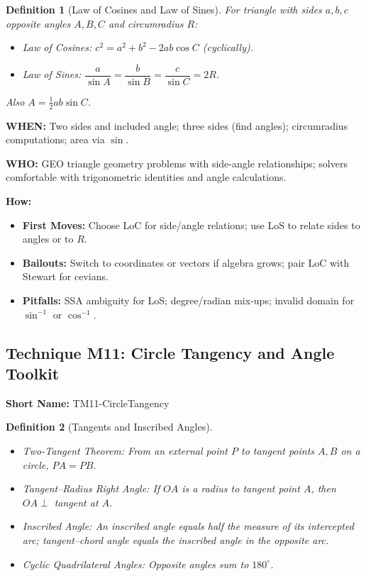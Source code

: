 \documentclass[12pt]{article}
\newtheorem{definition}{Definition}[section]
\begin{document}
\begin{definition}[Law of Cosines and Law of Sines]
For triangle with sides $a,b,c$ opposite angles $A,B,C$ and circumradius $R$:
\begin{itemize}
    \item Law of Cosines: $c^2=a^2+b^2-2ab\cos C$ (cyclically).
    \item Law of Sines: $\dfrac{a}{\sin A}=\dfrac{b}{\sin B}=\dfrac{c}{\sin C}=2R$.
\end{itemize}
Also $A=\tfrac{1}{2}ab\sin C$.
\end{definition}

\textbf{WHEN:} Two sides and included angle; three sides (find angles); circumradius computations; area via $\sin$.

\textbf{WHO:} GEO triangle geometry problems with side-angle relationships; solvers comfortable with trigonometric identities and angle calculations.

\textbf{How:}
\begin{itemize}
    \item \textbf{First Moves:} Choose LoC for side/angle relations; use LoS to relate sides to angles or to $R$.
    \item \textbf{Bailouts:} Switch to coordinates or vectors if algebra grows; pair LoC with Stewart for cevians.
    \item \textbf{Pitfalls:} SSA ambiguity for LoS; degree/radian mix-ups; invalid domain for $\sin^{-1}$ or $\cos^{-1}$.
\end{itemize}


\subsection{Technique M11: Circle Tangency and Angle Toolkit}
\textbf{Short Name:} TM11-CircleTangency

\begin{definition}[Tangents and Inscribed Angles]
\begin{itemize}
    \item Two-Tangent Theorem: From an external point $P$ to tangent points $A,B$ on a circle, $PA=PB$.
    \item Tangent–Radius Right Angle: If $OA$ is a radius to tangent point $A$, then $OA\perp$ tangent at $A$.
    \item Inscribed Angle: An inscribed angle equals half the measure of its intercepted arc; tangent–chord angle equals the inscribed angle in the opposite arc.
    \item Cyclic Quadrilateral Angles: Opposite angles sum to $180^\circ$.
\end{itemize}
\end{definition}
\end{document}

